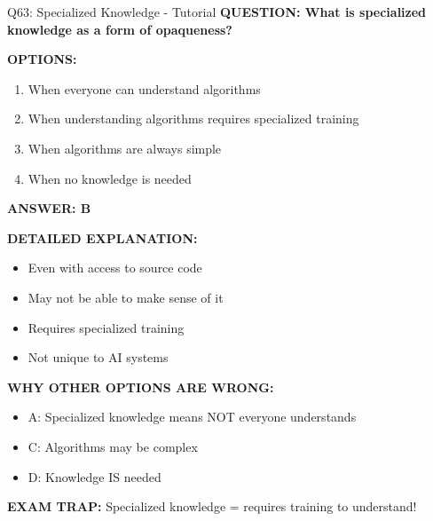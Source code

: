 \documentclass[8pt]{beamer}
\begin{document}
	\begin{frame}{Q63: Specialized Knowledge - Tutorial}
		\fontsize{6.5}{7.5}\selectfont
		\textbf{QUESTION: What is specialized knowledge as a form of opaqueness?}
		
		\vspace{0.1cm}
		\textbf{OPTIONS:}
		\begin{enumerate}
			\item When everyone can understand algorithms
			\item When understanding algorithms requires specialized training
			\item When algorithms are always simple
			\item When no knowledge is needed
		\end{enumerate}
		
		\vspace{0.1cm}
		\textcolor{myblue}{\textbf{ANSWER: B}}
		
		\vspace{0.1cm}
		\textbf{DETAILED EXPLANATION:}
		\begin{itemize}
			\item Even with access to source code
			\item May not be able to make sense of it
			\item Requires specialized training
			\item Not unique to AI systems
		\end{itemize}
		
		\vspace{0.1cm}
		\textcolor{myred}{\textbf{WHY OTHER OPTIONS ARE WRONG:}}
		\begin{itemize}
			\item \textcolor{myred}{A:} Specialized knowledge means NOT everyone understands
			\item \textcolor{myred}{C:} Algorithms may be complex
			\item \textcolor{myred}{D:} Knowledge IS needed
		\end{itemize}
		
		\textcolor{myred}{\textbf{EXAM TRAP:}} Specialized knowledge = \textcolor{myblue}{requires training to understand}!
	\end{frame}
	
\end{document}
